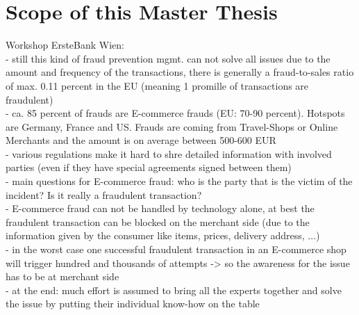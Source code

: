 
\section{Scope of this Master Thesis}
\label{sec:scope_thesis}

Workshop ErsteBank Wien: \\
- still this kind of fraud prevention mgmt. can not solve all issues due to the amount and frequency of the transactions, there is generally a
fraud-to-sales ratio of max. 0.11 percent in the EU (meaning 1 promille of transactions are fraudulent) \\

- ca. 85 percent of frauds are E-commerce frauds (EU: 70-90 percent). Hotspots are Germany, France and US. Frauds are coming from Travel-Shops or Online Merchants and the amount is on average between 500-600 EUR \\
- various regulations make it hard to shre detailed information with involved parties (even if they have special agreements signed between them) \\
- main questions for E-commerce fraud: who is the party that is the victim of the incident? Is it really a fraudulent transaction? \\
- E-commerce fraud can not be handled by technology alone, at best the fraudulent transaction can be blocked on the merchant side (due to the information given by the consumer like items, prices, delivery address, ...) \\
- in the worst case one successful fraudulent transaction in an E-commerce shop will trigger hundred and thousands of attempts -> so the awareness for the issue has to be at merchant side \\
- at the end: much effort is assumed to bring all the experts together and solve the issue by putting their individual know-how on the table \\



